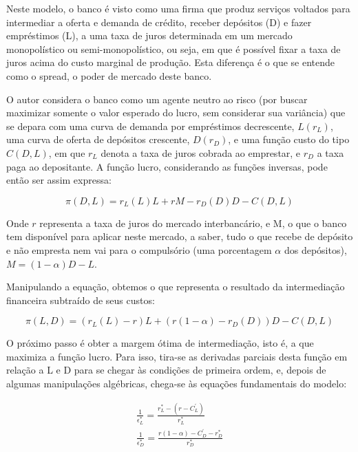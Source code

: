 \documentclass[a4paper,
               article,
               12pt,
               openany,
               oneside,
               english,
               brazil]{abntex2}
\numberwithin{equation}{section}
\begin{document}
    Neste modelo, o banco é visto como uma firma que produz serviços voltados para intermediar a oferta e demanda de crédito, receber depósitos (D) e fazer empréstimos (L), a uma taxa de juros determinada em um mercado monopolístico ou semi-monopolístico, ou seja, em que é possível fixar a taxa de juros acima do custo marginal de produção. Esta diferença é o que se entende como o spread, o poder de mercado deste banco. \cite{oreiro}

    O autor considera o banco como um agente neutro ao risco (por buscar maximizar somente o valor esperado do lucro, sem considerar sua variância) que se depara com uma curva de demanda por empréstimos decrescente, $ L(r_L) $, uma curva de oferta de depósitos crescente, $ D(r_D) $, e uma função custo do tipo $ C(D, L) $, em que $ r_L $ denota a taxa de juros cobrada ao emprestar, e $ r_D $ a taxa paga ao depositante. A função lucro, considerando as funções inversas, pode então ser assim expressa: 
    
    \begin{equation} \pi(D, L) = r_L(L)L + rM - r_D(D)D - C(D, L) \end{equation}
        
    Onde $ r $ representa a taxa de juros do mercado interbancário, e M, o que o banco tem disponível para aplicar neste mercado, a saber, tudo o que recebe de depósito e não empresta nem vai para o compulsório (uma porcentagem $\alpha$ dos depósitos), $M = (1 - \alpha)D - L$. 

    Manipulando a equação, obtemos o que representa o resultado da intermediação financeira subtraído de seus custos: 
    
    \begin{equation} \pi(L, D) = (r_L(L) - r)L + (r(1 - \alpha) - r_D(D))D - C(D, L) \end{equation}

    O próximo passo é obter a margem ótima de intermediação, isto é, a que maximiza a função lucro. Para isso, tira-se as derivadas parciais desta função em relação a L e D para se chegar às condições de primeira ordem, e, depois de algumas manipulações algébricas, chega-se às equações fundamentais do modelo:

    \begin{gather}
        \frac{1}{\epsilon^{*}_L} = \frac{r^{*}_L - (r - C^{'}_L)}{r^{*}_L} \\
        \frac{1}{\epsilon^{*}_D} = \frac{r(1-\alpha)-C^{'}_D - r^{*}_D}{r^{*}_D}
    \end{gather}
\end{document}
